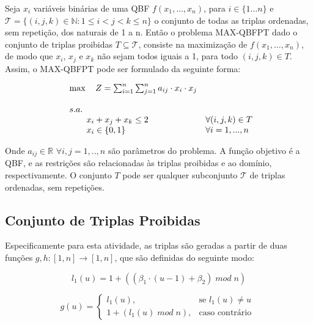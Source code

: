\documentclass{MO824}
\newcommand{\N}{\mathbb{N}}
\newcommand{\R}{\mathbb{R}}
\begin{document}
    Seja $x_i$ variáveis binárias de uma QBF $f(x_1, \dots, x_n)$, para $i \in \{1 \dots n\}$ e $\mathcal{T} = \{(i,j,k)\in \N : 1 \leq i < j < k \leq n\}$ o conjunto de todas as triplas ordenadas, sem repetição, dos naturais de 1 a n. Então o problema MAX-QBFPT dado o conjunto de triplas proibidas $T \subseteq \mathcal{T}$, consiste na maximização de $f(x_1, \dots, x_n)$, de modo que $x_i$, $x_j$ e $x_k$ não sejam todos iguais a 1, para todo $(i, j, k) \in T$. Assim, o MAX-QBFPT pode ser formulado da seguinte forma:
    
    \begin{equation*}
    \begin{array}{ll@{}ll@{}ll}
    
    \max   \quad Z = \sum_{i=1}^{n} \sum_{j=1}^{n} a_{ij} \cdot x_i \cdot x_j
    \\
    \\
    s.a.
    \\
     \qquad x_i + x_j + x_k \leq 2 & \forall (i,j,k)\in T \\
    
     \qquad x_i \in \{0,1\} & \forall i = {1, ... , n}
    
    \end{array}
    \end{equation*}
    
    Onde $a_{ij}\in\R$ $\forall i,j = 1,..,n$ são parâmetros do problema. A função objetivo é a QBF, e as restrições são relacionadas às triplas proibidas e ao domínio, respectivamente. O conjunto $T$ pode ser qualquer subconjunto $\mathcal{T}$ de triplas ordenadas, sem repetições.
    
    \subsection{Conjunto de Triplas Proibidas}
    
    Especificamente para esta atividade, as triplas são geradas a partir de duas funções $g,h : [1, n] \rightarrow [1, n]$, que são definidas do seguinte modo:
    
    
    \begin{equation*}
    l_1(u) = 1 + ((\beta_1 \cdot (u - 1) + \beta_2 ) \; mod \; n) 
    \end{equation*}
    
    
    \begin{equation*}
    g(u) = \begin{cases} l_1(u), & \mbox{se } l_1(u) \neq u \\
                        1 + (l_1(u) \; mod \; n), & \mbox{caso contrário } \end{cases}
    \end{equation*}
    
\end{document}

